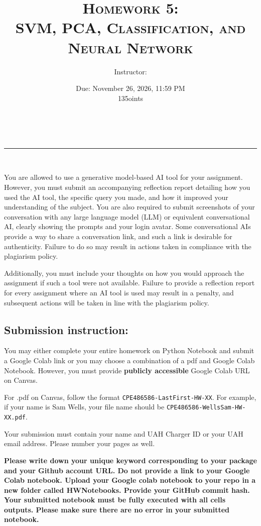 \documentclass[12pt, xcolor=dvipsnames,svgnames,x11names]{article}
\makeatletter
\newcommand{\hdrrule}{{\color{hdrcoral}\rule{4.5em}{1.1pt}}}
\renewcommand{\maketitle}{%
      \begin{center}
         \begin{tcolorbox}[
               enhanced,
               colback=white,
               colframe=hdrslate,
               boxrule=0.8pt,
               arc=4pt,
               left=0pt,
               right=0pt,
               top=0pt,
               bottom=0pt,
               drop shadow={hdrslate!35!white},
         ]
               \begin{tcolorbox}[
                  enhanced,
                  colback=hdrplum,
                  colframe=hdrplum,
                  boxrule=0pt,
                  arc=4pt,
                  sharp corners=south,
                  left=2em,
                  right=2em,
                  top=1.1em,
                  bottom=1.1em,
                  borderline south={2.2pt}{0pt}{hdrcoral},
               ]
                  \centering
                  {\LARGE\color{white}\linespread{1.25}\selectfont\@title}
               \end{tcolorbox}

               \vspace{1.1em}
               \centering
               {\large\color{hdrslate}\@author}\\[0.7em]
               \hdrrule\\[0.7em]
               {\normalsize\color{hdrplum}\@date}
               \vspace{1.1em}
         \end{tcolorbox}
      \end{center}
      \vspace{1.5em}
}
\newcommand{\hw}{Homework 5:\\\normalsize SVM, PCA, Classification, and Neural Network}
\newcommand{\duedate}{November 26, 2026, 11:59 PM}
\makeatother
\begin{document}
\title{\textsc{\hw\\
\coursenumber}}
\author{Instructor: \instructorname}
\date{Due: \duedate\\ 135oints}

\maketitle

\setlength{\unitlength}{1in}
You are allowed to use a generative model-based AI tool for your assignment. However, you must submit an accompanying reflection report detailing how you used the AI tool, the specific query you made, and how it improved your understanding of the subject. You are also required to submit screenshots of your conversation with any large language model (LLM) or equivalent conversational AI, clearly showing the prompts and your login avatar. Some conversational AIs provide a way to share a conversation link, and such a link is desirable for authenticity. Failure to do so may result in actions taken in compliance with the plagiarism policy.

Additionally, you must include your thoughts on how you would approach the assignment if such a tool were not available. Failure to provide a reflection report for every assignment where an AI tool is used may result in a penalty, and subsequent actions will be taken in line with the plagiarism policy.

\subsection*{Submission instruction:}
You may either complete your entire homework on Python Notebook  and submit a Google Colab link or you may choose a combination of a pdf and Google Colab Notebook. However, you must provide \textbf{publicly accessible} Google Colab URL on Canvas.

For .pdf on Canvas, follow the format  \texttt{CPE486586-LastFirst-HW-XX}. For example, if your name is Sam Wells, your file name should be \texttt{CPE486586-WellsSam-HW-XX.pdf}.

Your submission must contain your name and UAH Charger ID or your UAH email address.  Please number your pages as well.

\textbf{Please write down your unique keyword corresponding to your package and your Github account URL. Do not provide a link to your Google Colab notebook. Upload your Google colab notebook to your repo in a new folder called \textbf{HWNotebooks}. Provide your GitHub commit hash. Your submitted notebook must be fully executed with all cells outputs. Please make sure there are no error in your submitted notebook.}
\end{document}
